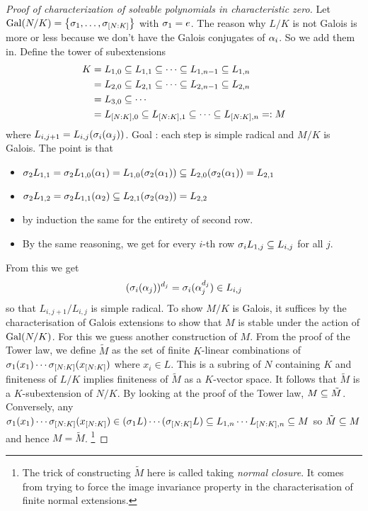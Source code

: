 \documentclass{article}
\begin{document}
\begin{proof}[Proof of characterization of solvable polynomials in characteristic zero]
  Let $\operatorname{Gal}(N / K) = \left\{\sigma_1 , \dots , \sigma_{[N : K]}\right\}$
  with $\sigma_1 = e$.
  The reason why $L / K$ is not Galois is more or less
  because we don't have the Galois conjugates of $\alpha_i$.
  So we add them in.
  Define the tower of subextensions \begin{align*}
    K &= L_{1 , 0} \subseteq L_{1 , 1} \subseteq \cdots \subseteq L_{1, n-1} \subseteq L_{1 , n} \\
    &= L_{2 , 0} \subseteq L_{2 , 1} \subseteq \cdots \subseteq L_{2 , n-1} \subseteq L_{2 , n} \\
    &= L_{3 , 0} \subseteq \cdots  \\
    &= L_{[N : K] , 0} \subseteq L_{[N : K] , 1} \subseteq \cdots \subseteq L_{[N : K] , n} =: M
  \end{align*}
  where $L_{i , j + 1} = L_{i , j}(\sigma_i(\alpha_j))$.
  Goal : each step is simple radical and $M / K$ is Galois.
  The point is that 
  \begin{itemize}
    \item $\sigma_2 L_{1 , 1} = \sigma_2 L_{1 , 0}(\alpha_1)
  = L_{1 , 0}(\sigma_2(\alpha_1)) \subseteq L_{2 , 0}(\sigma_2(\alpha_1)) = L_{2 , 1}$
  \item $\sigma_2 L_{1 , 2} = \sigma_2 L_{1, 1}(\alpha_2)
  \subseteq L_{2 , 1}(\sigma_2(\alpha_2)) = L_{2 , 2}$
  \item by induction the same for the entirety of second row.
  \item By the same reasoning, we get for every $i$-th row
  $\sigma_i L_{1, j} \subseteq L_{i , j}$ for all $j$.
  \end{itemize}
  From this we get 
  \[
    (\sigma_i(\alpha_j))^{d_j} = \sigma_i(\alpha_j^{d_j}) \in L_{i, j}
  \]
  so that $L_{i , j + 1} / L_{i , j}$ is simple radical.
  To show $M / K$ is Galois, it suffices by the characterisation of
  Galois extensions to show that $M$ is stable under the action of $\operatorname{Gal}(N / K)$.
  For this we guess another construction of $M$.
  From the proof of the Tower law,
  we define $\tilde{M}$ as the set of finite $K$-linear combinations
  of $\sigma_1(x_1) \cdots \sigma_{[N : K]}(x_{[N : K]})$ where $x_i \in L$.
  This is a subring of $N$ containing $K$
  and finiteness of $L / K$ implies finiteness of $\tilde{M}$
  as a $K$-vector space.
  It follows that $\tilde{M}$ is a $K$-subextension of $N / K$.
  By looking at the proof of the Tower law, $M \subseteq \tilde{M}$.
  Conversely, any $\sigma_1(x_1) \cdots \sigma_{[N : K]}(x_{[N : K]})
  \in (\sigma_1 L) \cdots (\sigma_{[N : K]} L) 
  \subseteq L_{1 , n} \cdots L_{[N : K] , n} \subseteq M$
  so $\tilde{M} \subseteq M$ and hence $M = \tilde{M}$.
  \footnote{
    The trick of constructing $\tilde{M}$ here is called 
    taking \emph{normal closure}.
    It comes from trying to force the image invariance property 
    in the characterisation of finite normal extensions.
  }


\end{proof}
\end{document}

